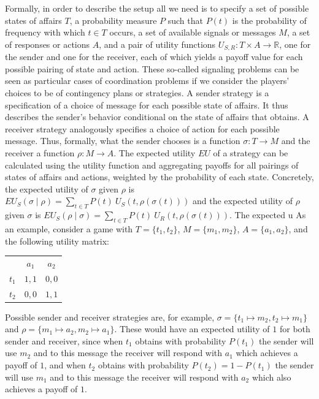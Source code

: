 \documentclass[a4paper]{article}
\begin{document}
Formally, in order to describe the setup all we need is to specify a set of possible states of affairs $T$, a probability measure $P$ such that $P(t)$ is the probability of frequency with which $t \in T$ occurs, a set of available signals or messages $M$, a set of responses or actions $A$, and a pair of utility functions $U_{S,R} : T \times A \rightarrow \mathbb{R}$, one for the sender and one for the receiver, each of which yields a payoff value for each possible pairing of state and action.
These so-called signaling problems can be seen as particular cases of coordination problems if we consider the players' choices to be of contingency plans or strategies.
A sender strategy is a specification of a choice of message for each possible state of affairs.
It thus describes the sender's behavior conditional on the state of affairs that obtains.
A receiver strategy analogously specifies a choice of action for each possible message.
Thus, formally, what the sender chooses is a function $\sigma : T \rightarrow M$ and the receiver a function $\rho : M \rightarrow A$.
The expected utility $EU$ of a strategy can be calculated using the utility function and aggregating payoffs for all pairings of states of affairs and actions, weighted by the probability of each state. Concretely, the expected utility of $\sigma$ given $\rho$ is $EU_S(\sigma \mid \rho) = \sum_{t \in T} P(t) \ U_S(t, \rho(\sigma(t)))$ and the expected utility of $\rho$ given $\sigma$ is $EU_S(\rho \mid \sigma) = \sum_{t \in T} P(t) \ U_R(t, \rho(\sigma(t)))$.
The expected u %
As an example, consider a game with $T = \lbrace t_1, t_2 \rbrace$, $M = \lbrace m_1, m_2 \rbrace$, $A = \lbrace a_1, a_2 \rbrace$, and the following utility matrix:
\begin{center}
\begin{tabular}{r|c|c|}
\multicolumn{1}{r}{}
 & \multicolumn{1}{c}{$a_1$}
 & \multicolumn{1}{c}{$a_2$} \\ \cline{2-3}
   $t_1$ & $1,1$ & $0,0$ \\ \cline{2-3}
   $t_2$ & $0,0$ & $1,1$ \\ \cline{2-3}
\end{tabular}
\end{center}
Possible sender and receiver strategies are, for example, $\sigma = \lbrace t_1 \mapsto m_2, t_2 \mapsto m_1 \rbrace$ and $\rho = \lbrace m_1 \mapsto a_2, m_2 \mapsto a_1 \rbrace$.
These would have an expected utility of $1$ for both sender and receiver, since when $t_1$ obtains with probability $P(t_1)$ the sender will use $m_2$ and to this message the receiver will respond with $a_1$ which achieves a payoff of $1$, and when $t_2$ obtains with probability $P(t_2) = 1-P(t_1)$ the sender will use $m_1$ and to this message the receiver will respond with $a_2$ which also achieves a payoff of $1$.
\end{document}
